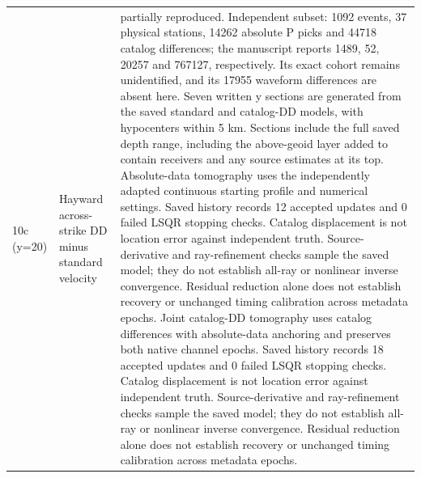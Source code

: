 \begin{longtable}{>{\raggedright\arraybackslash}p{}>{\raggedright\arraybackslash}p{}>{\raggedright\arraybackslash}p{}}
10c (y=20) & Hayward across-strike DD minus standard velocity & partially reproduced. Independent subset: 1092 events, 37 physical stations, 14262 absolute P picks and 44718 catalog differences; the manuscript reports 1489, 52, 20257 and 767127, respectively. Its exact cohort remains unidentified, and its 17955 waveform differences are absent here. Seven written y sections are generated from the saved standard and catalog-DD models, with hypocenters within 5 km. Sections include the full saved depth range, including the above-geoid layer added to contain receivers and any source estimates at its top. Absolute-data tomography uses the independently adapted continuous starting profile and numerical settings. Saved history records 12 accepted updates and 0 failed LSQR stopping checks. Catalog displacement is not location error against independent truth. Source-derivative and ray-refinement checks sample the saved model; they do not establish all-ray or nonlinear inverse convergence. Residual reduction alone does not establish recovery or unchanged timing calibration across metadata epochs. Joint catalog-DD tomography uses catalog differences with absolute-data anchoring and preserves both native channel epochs. Saved history records 18 accepted updates and 0 failed LSQR stopping checks. Catalog displacement is not location error against independent truth. Source-derivative and ray-refinement checks sample the saved model; they do not establish all-ray or nonlinear inverse convergence. Residual reduction alone does not establish recovery or unchanged timing calibration across metadata epochs.\\

\end{longtable}
